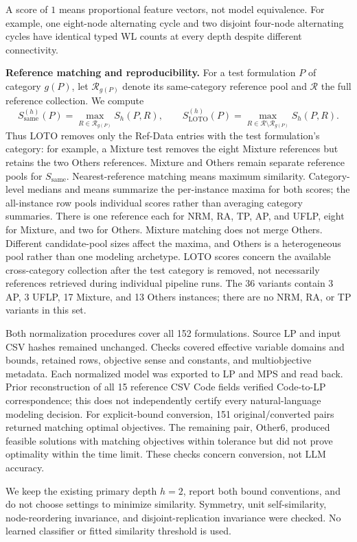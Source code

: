 \documentclass[10pt]{article}
\begin{document}
A score of $1$ means proportional feature vectors, not model equivalence.
For example, one eight-node alternating cycle and two disjoint
four-node alternating cycles have identical typed WL counts at every
depth despite different connectivity.

\medskip
\textbf{Reference matching and reproducibility.}
For a test formulation $P$ of category $g(P)$, let
$\mathcal R_{g(P)}$ denote its same-category reference pool and
$\mathcal R$ the full reference collection. We compute
\[
 S_{\mathrm{same}}^{(h)}(P)
 =\max_{R\in\mathcal R_{g(P)}}S_h(P,R),
 \qquad
 S_{\mathrm{LOTO}}^{(h)}(P)
 =\max_{R\in\mathcal R\setminus\mathcal R_{g(P)}}S_h(P,R).
\]
Thus LOTO removes only the Ref-Data entries with the test formulation's
category: for example, a Mixture test removes the eight Mixture
references but retains the two Others references. Mixture and Others
remain separate reference pools for $S_{\mathrm{same}}$.
Nearest-reference matching means maximum similarity. Category-level
medians and means summarize the per-instance maxima for both scores;
the all-instance row pools individual scores rather than averaging
category summaries.
There is one reference each for NRM, RA, TP, AP, and UFLP, eight for
Mixture, and two for Others. Mixture matching does not merge Others.
Different candidate-pool sizes affect the maxima, and Others is a
heterogeneous pool rather than one modeling archetype.
LOTO scores concern the available cross-category collection after the
test category is removed, not necessarily references retrieved during
individual pipeline runs.
The 36 variants contain 3 AP, 3 UFLP, 17 Mixture, and 13 Others
instances; there are no NRM, RA, or TP variants in this set.

Both normalization procedures cover all 152 formulations.
Source LP and input CSV hashes remained unchanged.
Checks covered effective variable domains and bounds, retained rows,
objective sense and constants, and multiobjective metadata.
Each normalized model was exported to LP and MPS and read back.
Prior reconstruction of all 15 reference CSV Code fields verified
Code-to-LP correspondence; this does not independently certify every
natural-language modeling decision.
For explicit-bound conversion, 151 original/converted pairs returned
matching optimal objectives. The remaining pair, Other6, produced
feasible solutions with matching objectives within tolerance but did
not prove optimality within the time limit.
These checks concern conversion, not LLM accuracy.

We keep the existing primary depth $h=2$, report both bound conventions,
and do not choose settings to minimize similarity.
Symmetry, unit self-similarity, node-reordering invariance, and
disjoint-replication invariance were checked.
No learned classifier or fitted similarity threshold is used.
\end{document}

